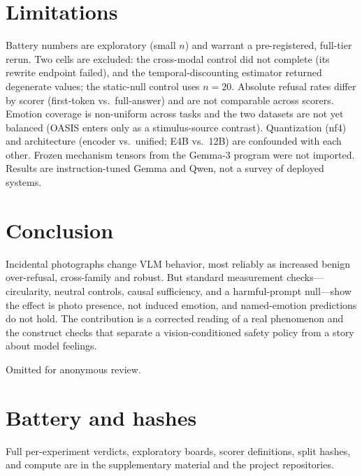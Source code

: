 \documentclass{article}
\begin{document}
\section{Limitations}
\label{sec:limitations}
Battery numbers are exploratory (small $n$) and warrant a pre-registered, full-tier rerun. Two cells are excluded: the cross-modal control did not complete (its rewrite endpoint failed), and the temporal-discounting estimator returned degenerate values; the static-null control uses $n=20$. Absolute refusal rates differ by scorer (first-token vs.\ full-answer) and are not comparable across scorers. Emotion coverage is non-uniform across tasks and the two datasets are not yet balanced (OASIS enters only as a stimulus-source contrast). Quantization (nf4) and architecture (encoder vs.\ unified; E4B vs.\ 12B) are confounded with each other. Frozen mechanism tensors from the Gemma-3 program were not imported. Results are instruction-tuned Gemma and Qwen, not a survey of deployed systems.

\section{Conclusion}
\label{sec:conclusion}
Incidental photographs change VLM behavior, most reliably as increased benign over-refusal, cross-family and robust. But standard measurement checks---circularity, neutral controls, causal sufficiency, and a harmful-prompt null---show the effect is photo presence, not induced emotion, and named-emotion predictions do not hold. The contribution is a corrected reading of a real phenomenon and the construct checks that separate a vision-conditioned safety policy from a story about model feelings.

\begin{ack}
Omitted for anonymous review.
\end{ack}

\small



\appendix
\section{Battery and hashes}
Full per-experiment verdicts, exploratory boards, scorer definitions, split hashes, and compute are in the supplementary material and the project repositories.

\newpage

\end{document}
